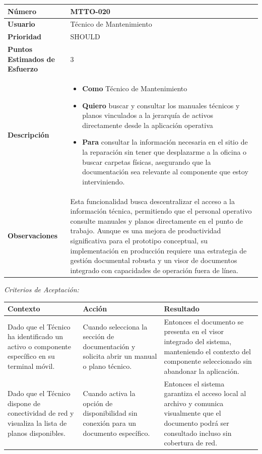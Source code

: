 \begin{longtable}{|p{0.21\textwidth}|p{0.74\textwidth}|}\hline
\textbf{Número} & MTTO-020 \\ \hline
\textbf{Usuario} & Técnico de Mantenimiento \\ \hline
\textbf{Prioridad} & SHOULD \\ \hline
\textbf{Puntos Estimados de Esfuerzo} & 3 \\ \hline
\textbf{Descripción} & \parbox[t]{\linewidth}{\vspace{2pt}\begin{itemize}[leftmargin=1.5em, nosep, topsep=0pt]
\item \textbf{Como} Técnico de Mantenimiento
\item \textbf{Quiero} buscar y consultar los manuales técnicos y planos vinculados a la jerarquía de activos directamente desde la aplicación operativa
\item \textbf{Para} consultar la información necesaria en el sitio de la reparación sin tener que desplazarme a la oficina o buscar carpetas físicas, asegurando que la documentación sea relevante al componente que estoy interviniendo.
\end{itemize}\vspace{2pt}} \\ \hline
\textbf{Observaciones} & Esta funcionalidad busca descentralizar el acceso a la información técnica, permitiendo que el personal operativo consulte manuales y planos directamente en el punto de trabajo. Aunque es una mejora de productividad significativa para el prototipo conceptual, su implementación en producción requiere una estrategia de gestión documental robusta y un visor de documentos integrado con capacidades de operación fuera de línea. \\ \hline
\end{longtable}\normalsize
\noindent\textit{Criterios de Aceptación:}
\footnotesize\begin{longtable}{|p{0.28\textwidth}|p{0.32\textwidth}|p{0.34\textwidth}|}\hline
\textbf{Contexto} & \textbf{Acción} & \textbf{Resultado} \\ \hline
\parbox[t]{\linewidth}{Dado que el Técnico ha identificado un activo o componente específico en su terminal móvil.} & \parbox[t]{\linewidth}{Cuando selecciona la sección de documentación y solicita abrir un manual o plano técnico.} & \parbox[t]{\linewidth}{Entonces el documento se presenta en el visor integrado del sistema, manteniendo el contexto del componente seleccionado sin abandonar la aplicación.} \\ \hline
\parbox[t]{\linewidth}{Dado que el Técnico dispone de conectividad de red y visualiza la lista de planos disponibles.} & \parbox[t]{\linewidth}{Cuando activa la opción de disponibilidad sin conexión para un documento específico.} & \parbox[t]{\linewidth}{Entonces el sistema garantiza el acceso local al archivo y comunica visualmente que el documento podrá ser consultado incluso sin cobertura de red.} \\ \hline
\end{longtable}\normalsize
